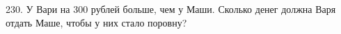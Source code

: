 230. У Вари на 300 рублей больше, чем у Маши. Сколько денег должна Варя отдать Маше, чтобы у них стало поровну?\\
